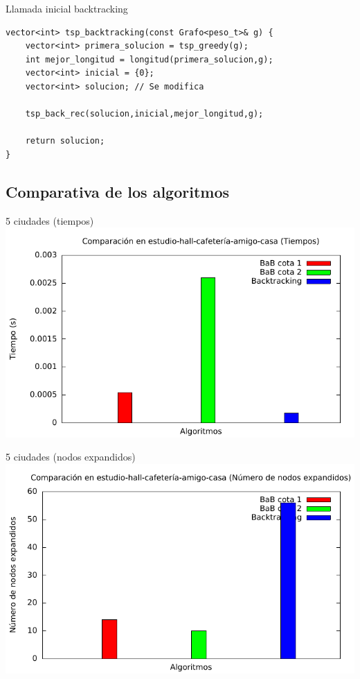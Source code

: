 \begin{frame}[fragile]{Llamada inicial backtracking}
\begin{lstlisting}
vector<int> tsp_backtracking(const Grafo<peso_t>& g) {
	vector<int> primera_solucion = tsp_greedy(g);
	int mejor_longitud = longitud(primera_solucion,g);
	vector<int> inicial = {0};
	vector<int> solucion; // Se modifica

	tsp_back_rec(solucion,inicial,mejor_longitud,g);

	return solucion;
}
\end{lstlisting}
\end{frame}

\subsection{Comparativa de los algoritmos}

\begin{frame}{5 ciudades (tiempos)}
\includegraphics[width=\textwidth]{img/barras_e-h-c-a-c5_t}
\end{frame}

\begin{frame}{5 ciudades (nodos expandidos)}
\includegraphics[width=\textwidth]{img/barras_e-h-c-a-c5_nodos}
\end{frame}

